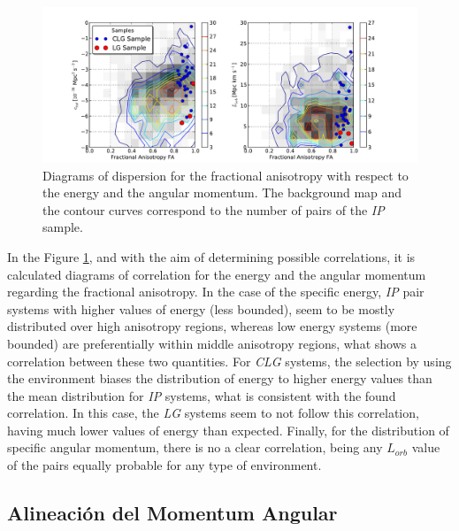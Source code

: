 \
\begin{figure}[htbp]
	\centering
	\includegraphics[trim = 20mm 0mm 35mm 10mm, clip, width=1.0\textwidth]
	{./figures/4_results/CLG_FA_E-L.pdf}
	
	\caption{\small{Diagrams of dispersion for the fractional anisotropy 
	with respect to the energy and the angular momentum. The background
	map and the contour curves correspond to the number of pairs of the
	\textit{IP} sample.}}
	\label{fig:CLG_FA_E-L}
\end{figure}


In the Figure \ref{fig:CLG_FA_E-L}, and with the aim of determining 
possible correlations, it is calculated diagrams of correlation for the 
energy and the angular momentum regarding the fractional anisotropy. In 
the case of the specific energy, \textit{IP} pair systems with higher
values of energy (less bounded), seem to be mostly distributed over high
anisotropy regions, whereas low energy systems (more bounded) are 
preferentially within middle anisotropy regions, what shows a correlation
between these two quantities. For \textit{CLG} systems, the selection by
using the environment biases the distribution of energy to higher energy 
values than the mean distribution for \textit{IP} systems, what is 
consistent with the found correlation. In this case, the \textit{LG} 
systems seem to not follow this correlation, having much lower values of 
energy than expected. Finally, for the distribution of specific angular 
momentum, there is no a clear correlation, being any $L_{orb}$ value of
the pairs equally probable for any type of environment.


	
	\subsection{Alineación del Momentum Angular}
	\label{subsec:AngularMomentumAlineation}
	
